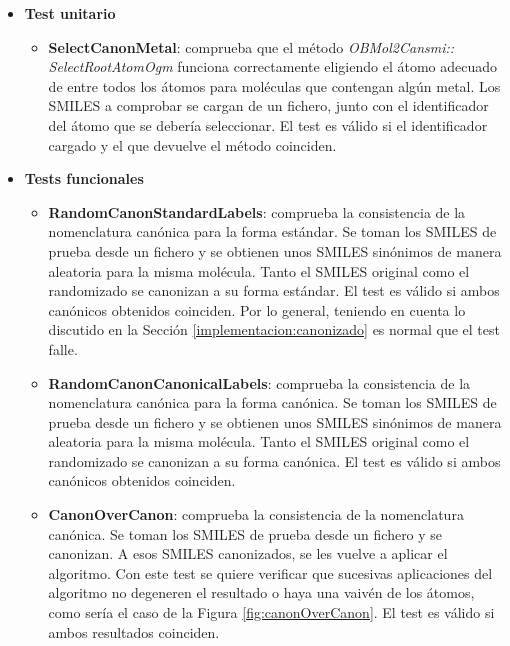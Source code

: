 \begin{itemize}
    \item \textbf{Test unitario}
    \begin{itemize}
        \item \textbf{SelectCanonMetal}: comprueba que el método \textit{OBMol2Cansmi:: SelectRootAtomOgm} funciona correctamente eligiendo el átomo adecuado de entre todos los átomos para moléculas que contengan algún metal. Los SMILES a comprobar se cargan de un fichero, junto con el identificador del átomo que se debería seleccionar. El test es válido si el identificador cargado y el que devuelve el método coinciden.
    \end{itemize}

    \item \textbf{Tests funcionales}
    \begin{itemize}
        \item \textbf{RandomCanonStandardLabels}: comprueba la consistencia de la nomenclatura canónica para la forma estándar. Se toman los SMILES de prueba desde un fichero y se obtienen unos SMILES sinónimos de manera aleatoria para la misma molécula. Tanto el SMILES original como el randomizado se canonizan a su forma estándar. El test es válido si ambos canónicos obtenidos coinciden. Por lo general, teniendo en cuenta lo discutido en la Sección \ref{implementacion:canonizado} es normal que el test falle.

        \item \textbf{RandomCanonCanonicalLabels}: comprueba la consistencia de la nomenclatura canónica para la forma canónica. Se toman los SMILES de prueba desde un fichero y se obtienen unos SMILES sinónimos de manera aleatoria para la misma molécula. Tanto el SMILES original como el randomizado se canonizan a su forma canónica. El test es válido si ambos canónicos obtenidos coinciden.
    
        \item \textbf{CanonOverCanon}: comprueba la consistencia de la nomenclatura canónica. Se toman los SMILES de prueba desde un fichero y se canonizan. A esos SMILES canonizados, se les vuelve a aplicar el algoritmo. Con este test se quiere verificar que sucesivas aplicaciones del algoritmo no degeneren el resultado o haya una vaivén de los átomos, como sería el caso de la Figura \ref{fig:canonOverCanon}. El test es válido si ambos resultados coinciden.


\end{itemize}
\end{itemize}
